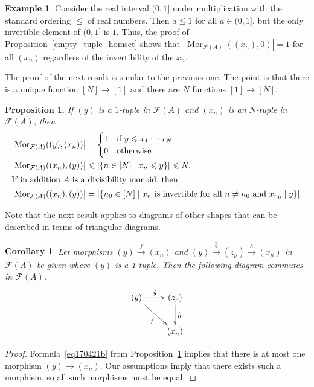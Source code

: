 \documentclass[reqno]{amsart}
\theoremstyle{plain}
\newtheorem{cor}[lem]{Corollary}
\newtheorem{prop}[lem]{Proposition}
\theoremstyle{definition}
\newtheorem{ex}[lem]{Example}
\newcommand{\cat}[1]{\mathcal{#1}}
\newcommand{\catf}{\cat{F}}
\newcommand{\xra}{\xrightarrow}
\newcommand{\emptytuple}{\mathfrak{0}}
\renewcommand{\leq}{\leqslant}
\newcommand{\mor}[3]{\operatorname{Mor}_{#1}(#2,#3)}
\numberwithin{equation}{lem}
\begin{document}
\begin{ex}\label{ex170421a}
Consider the real interval $(0,1]$ under multiplication with the standard ordering $\leq$ of real numbers. 
Then $a\leq 1$ for all $a\in (0,1]$, but the only invertible element of $(0,1]$ is $1$. 
Thus, the proof of 
Proposition~\ref{empty_tuple_homset}
shows that 
$\left|\mor{\mathcal{F}(A)}{(x_n)}{\emptytuple}\right|=1$ for all $(x_n)$ regardless of the invertibility of the $x_n$.
\end{ex}

The proof of the next result is similar to
the previous one. The point is that there is a unique function
$[N]\to[1]$ and there are $N$ functions $[1]\to[N]$.

\begin{prop}\label{singletons_unique}
If $(y)$ is a $1$-tuple in $\mathcal{F}(A)$ and $(x_n)$ is an $N$-tuple in $\mathcal{F}(A)$, then
\begin{align}
\left|\mor{\mathcal{F}(A)}{(y)}{(x_n)}\right| 
\label{eq170421b}
&=\begin{cases}
1&\text{if $y\leq x_1\cdots x_N$}\\
0&\text{otherwise}
\end{cases}
\\
\left|\mor{\mathcal{F}(A)}{(x_n)}{(y)}\right| 
\notag
&\leq |\{n\in[N]\mid x_n\leq y\}|
\leq N.
\\
\intertext{If in addition $A$ is a divisibility monoid, then}
\left|\mor{\mathcal{F}(A)}{(x_n)}{(y)}\right| 
\notag
&=|\{n_0\in[N]\mid \text{$x_n$ is invertible for all $n\neq n_0$ and $x_{n_0}\mid y$}\}|.
\end{align}
\end{prop}

Note that the next result applies to diagrams of other shapes that can be described in terms of triangular diagrams.

\begin{cor}\label{cor190115a}
Let morphisms $(y)\xra{\hat f}(x_n)$ and $(y)\xra{\hat g}(z_p)\xra{\hat h}(x_n)$
in $\catf(A)$ be given where $(y)$ is a 1-tuple. Then the following diagram commutes in $\catf(A)$.
$$\xymatrix{(y)\ar[r]^-{\hat g}\ar[rd]_{\hat f}
&(z_p)\ar[d]^{\hat h}\\
&(x_n)}$$
\end{cor}

\begin{proof}
Formula~\eqref{eq170421b} from Proposition~\ref{singletons_unique} implies that there is at most one morphism
$(y)\to(x_n)$. Our assumptions imply that there exists such a morphism, so all such morphisms must be equal.
\end{proof}
\end{document}
